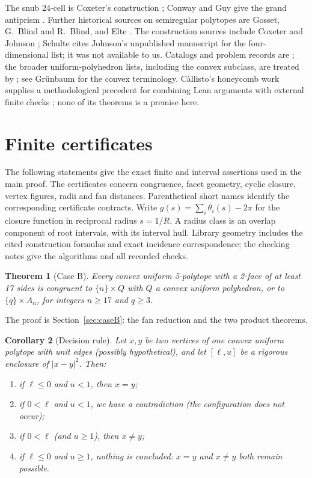 \documentclass[11pt]{article}
\newtheorem{theorem}{Theorem}
\newtheorem{corollary}[theorem]{Corollary}
\theoremstyle{definition}
\theoremstyle{remark}
\begin{document}
\begin{appendices}
The snub 24-cell is Coxeter's construction \cite[Section 8.4]{CoxeterRP};
Conway and Guy give the grand antiprism \cite{ConwayGuy1965}.
Further historical sources on semiregular polytopes are Gosset,
G.~Blind and R.~Blind, and Elte \cite{Gosset1900,Blind1991,Elte1912}.
The construction sources include Coxeter and Johnson
\cite{CoxeterRP,CoxeterLHM1954,Johnson1966}; Schulte cites Johnson’s unpublished manuscript \cite{Johnson1991} for the four-dimensional list; it was not available to us. Catalogs and problem records are
\cite{Bowers,Klitzing,OPG,PolytopeWiki}; the broader uniform-polyhedron lists, including the convex subclass, are treated by \cite{CoxeterLHM1954,Sopov1970,Skilling1975}; see Grünbaum \cite{Grunbaum2009} for the convex terminology. Càllisto’s honeycomb work supplies a methodological precedent for combining Lean arguments with external finite checks \cite[Sections 1 and 11, pp.~4 and 31--32]{CallistoUniform}; none of its theorems is a premise here.


\section{Finite certificates}\label{app:certificates}
The following statements give the exact finite and interval assertions used in the main proof. The certificates concern congruence, facet geometry, cyclic closure, vertex figures, radii and fan distances. Parenthetical short names identify the corresponding certificate contracts. Write $g(s)=\sum_i\theta_i(s)-2\pi$ for the closure function in reciprocal radius $s=1/R$. A radius class is an overlap component of root intervals, with its interval hull. Library geometry includes the cited construction formulas and exact incidence correspondence; the checking notes give the algorithms and all recorded checks.\par
\begin{theorem}[Case B]\label{thm:B}
Every convex uniform 5-polytope with a 2-face of at least 17 sides is
congruent to $\{n\}\times Q$ with $Q$ a convex uniform polyhedron, or to
$\{q\}\times A_n$, for integers $n\ge17$ and $q\ge3$.
\end{theorem}
The proof is Section~\ref{sec:caseB}: the fan reduction and the two product theorems.


\begin{corollary}[Decision rule]\label{cor:decide}
Let $x,y$ be two vertices of one convex uniform polytope with unit edges
(possibly hypothetical), and let $[\ell,u]$ be a rigorous enclosure of
$|x-y|^2$. Then:
\begin{enumerate}[label=\textup{(\alph*)}]
\item if $\ell\le0$ and $u<1$, then $x=y$;
\item if $0<\ell$ and $u<1$, we have a contradiction (the configuration
  does not occur);
\item if $0<\ell$ (and $u\ge1$), then $x\ne y$;
\item if $\ell\le0$ and $u\ge1$, nothing is concluded: $x=y$ and $x\ne y$
  both remain possible.
\end{enumerate}
\end{corollary}


\end{appendices}
\end{document}
